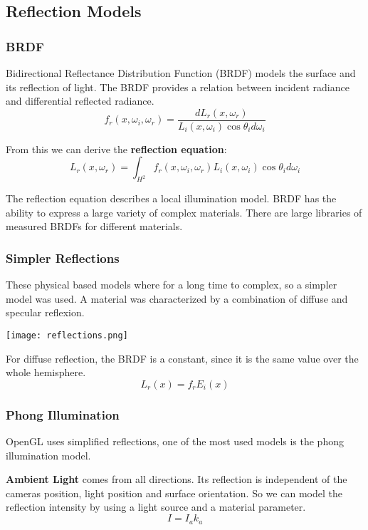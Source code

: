 \subsection{Reflection Models}

\subsubsection{BRDF}

Bidirectional Reflectance Distribution Function (BRDF) models the surface and its reflection of light. The BRDF provides a relation between incident radiance and differential reflected radiance.
$$f_r(x, \omega_i, \omega_r) = \frac{dL_r(x, \omega_r)}{L_i(x, \omega_i) \cos \theta_i d \omega_i}$$

From this we can derive the \textbf{reflection equation}:
$$L_r(x, \omega_r) = \int_{H^2} f_r(x, \omega_i, \omega_r) L_i(x, \omega_i) \cos \theta_i d \omega_i$$

The reflection equation describes a local illumination model. BRDF has the ability to express a large variety of complex materials. There are large libraries of measured BRDFs for different materials.

\subsubsection{Simpler Reflections}

These physical based models where for a long time to complex, so a simpler model was used. A material was characterized by a combination of diffuse and specular reflexion.
\begin{center}
	\texttt{[image: reflections.png]}
\end{center}

For diffuse reflection, the BRDF is a constant, since it is the same value over the whole hemisphere.
$$L_r(x) = f_r E_i(x)$$

\subsubsection{Phong Illumination}

OpenGL uses simplified reflections, one of the most used models is the phong illumination model. \medskip

\textbf{Ambient Light} comes from all directions. Its reflection is independent of the cameras position, light position and surface orientation. So we can model the reflection intensity by using a light source and a material parameter.
$$I = I_a k_a$$

